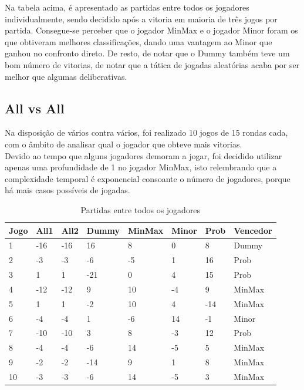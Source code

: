 \documentclass[12pt]{article}
\begin{document}
	Na tabela acima, é apresentado as partidas entre todos os jogadores individualmente, sendo decidido após a vitoria em maioria de três jogos por partida. Consegue-se perceber que o jogador MinMax e o jogador Minor foram os que obtiveram melhores classificações, dando uma vantagem ao Minor que ganhou no confronto direto. De resto, de notar que o Dummy também teve um bom número de vitorias, de notar que a tática de jogadas aleatórias acaba por ser melhor que algumas deliberativas.\\
	
	\subsection*{All vs All}
	Na disposição de vários contra vários, foi realizado 10 jogos de 15 rondas cada, com o âmbito de analisar qual o jogador que obteve mais vitorias.\\
    Devido ao tempo que alguns jogadores demoram a jogar, foi decidido utilizar apenas uma profundidade de 1 no jogador MinMax, isto relembrando que a complexidade temporal é exponencial consoante o número de jogadores, porque há mais casos possíveis de jogadas.\\

	\begin{table}[h]
	    \centering
	    \begin{tabular}{ |p{1.5cm}|p{1.5cm}|p{1.5cm}|p{1.5cm}|p{1.5cm}|p{1.5cm}|p{1.5cm}|p{2cm}|  }
	    \hline
	    Jogo & All1	& All2	& Dummy & MinMax & Minor & Prob & Vencedor\\\hline
	    1	& -16	& -16	& 16	& 8	    & 0	    & 8	    & Dummy\\\hline
        2	& -3	& -3	& -6	& -5	& 1	    & 16	& Prob\\\hline
        3	& 1	    & 1	    & -21	& 0     & 4	    & 15	& Prob\\\hline
        4	& -12	& -12	& 9	    &10     & -4	& 9	    & MinMax\\\hline
        5	& 1	    & 1	    & -2	& 10	& 4	    & -14	& MinMax\\\hline
        6	& -4	& -4	& 1	    & -6	& 14	& -1	& Minor\\\hline
        7	& -10	& -10	& 3	    & 8	    & -3	& 12	& Prob\\\hline
        8	& -4	& -4	& -6	& 14	&-5	    & 5	    & MinMax\\\hline
        9	& -2	& -2	& -14	& 9	    & 1	    & 8	    & MinMax\\\hline
        10	& -3	& -3	& -6	& 14	&-5	    & 3	    & MinMax\\\hline
	    \end{tabular}
    	\caption{Partidas entre todos os jogadores}
	\end{table}
	
\end{document}
